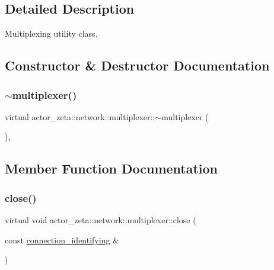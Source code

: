 \subsection{Detailed Description}
Multiplexing utility class. 

\subsection{Constructor \& Destructor Documentation}
\mbox{\label{structactor__zeta_1_1network_1_1multiplexer_a1dd1d5a78b60a3b33fcb54a6228da2d7}} 
\subsubsection{\texorpdfstring{$\sim$multiplexer()}{~multiplexer()}}
{\footnotesize\ttfamily virtual actor\+\_\+zeta\+::network\+::multiplexer\+::$\sim$multiplexer (\begin{DoxyParamCaption}{ }\end{DoxyParamCaption})\hspace{0.3cm}{\ttfamily [virtual]}, {\ttfamily [default]}}



\subsection{Member Function Documentation}
\mbox{\label{structactor__zeta_1_1network_1_1multiplexer_a083a55987b89b74917babec426e886b6}} 
\subsubsection{\texorpdfstring{close()}{close()}}
{\footnotesize\ttfamily virtual void actor\+\_\+zeta\+::network\+::multiplexer\+::close (\begin{DoxyParamCaption}\item[{const \hyperlink{classactor__zeta_1_1network_1_1connection__identifying}{connection\+\_\+identifying} \&}]{ }\end{DoxyParamCaption})\hspace{0.3cm}{\ttfamily [pure virtual]}}

